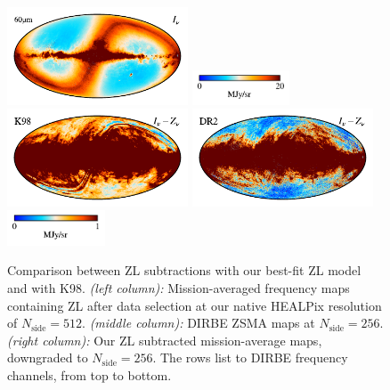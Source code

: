 \documentclass[twocolumn]{aa}
\begin{document}
\begin{figure}
    \includegraphics[height=2.90cm]{figs/compare_freq_maps/cosmoglobe_ma_07.pdf}%
    \includegraphics[width=2.90cm,angle=90]{figs/compare_freq_maps/cbar_tot_07.pdf}%
    \includegraphics[height=2.90cm]{figs/compare_freq_maps/dirbe_zsma_07.pdf}%
    \includegraphics[height=2.90cm]{figs/compare_freq_maps/cosmoglobe_zsma_07.pdf}%
    \includegraphics[width=2.90cm,angle=90]{figs/compare_freq_maps/cbar_07.pdf}%
      \\
    \caption{Comparison between ZL subtractions with our best-fit ZL model and with K98. 
    \textit{(left column):} Mission-averaged frequency maps containing ZL after data selection at our native HEALPix resolution 
    of $N_\mathrm{side} = 512$. \textit{(middle column):} DIRBE ZSMA maps
    at $N_\mathrm{side} = 256$.\textit{(right column):} Our ZL subtracted mission-average 
    maps, downgraded to $N_\mathrm{side} = 256$. The rows list to DIRBE frequency channels, from top to 
    bottom. 
    }
    \label{fig:dr2-zsma-compare1}
\end{figure}
\end{document}
